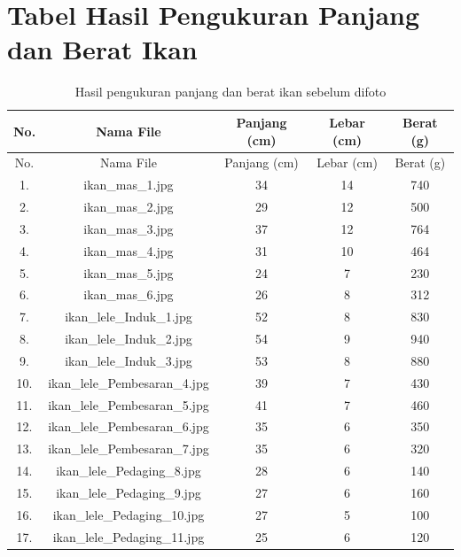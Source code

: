 \chapter{Tabel Hasil Pengukuran Panjang dan Berat Ikan}

\begin{longtable}{|c|c|c|c|c|}
        \caption{Hasil pengukuran panjang dan berat ikan sebelum difoto}\label{tab:Asli} \\
        \hline
        No. & Nama File & Panjang (cm) & Lebar (cm) & Berat (g) \\
        \hline
        \endfirsthead
        \hline
        No. & Nama File & Panjang (cm) & Lebar (cm) & Berat (g) \\
        \hline
        \endhead


        1. & ikan\_mas\_1.jpg & 34 & 14 & 740 \\
        \hline
        2. & ikan\_mas\_2.jpg & 29 & 12 & 500 \\
        \hline
        3. & ikan\_mas\_3.jpg & 37 & 12 & 764 \\
        \hline
        4. & ikan\_mas\_4.jpg & 31 &  10 & 464 \\
        \hline
        5. & ikan\_mas\_5.jpg & 24 & 7 & 230 \\
        \hline
        6. & ikan\_mas\_6.jpg & 26 & 8 & 312 \\
        \hline
        7. & ikan\_lele\_Induk\_1.jpg & 52 & 8 & 830 \\
        \hline
        8. & ikan\_lele\_Induk\_2.jpg & 54 & 9 & 940 \\
        \hline
        9. & ikan\_lele\_Induk\_3.jpg & 53 & 8 & 880 \\
        \hline
        10. & ikan\_lele\_Pembesaran\_4.jpg & 39 & 7 & 430 \\
        \hline
        11. & ikan\_lele\_Pembesaran\_5.jpg & 41 & 7 & 460 \\
        \hline
        12. & ikan\_lele\_Pembesaran\_6.jpg & 35 & 6 & 350 \\
        \hline
        13. & ikan\_lele\_Pembesaran\_7.jpg & 35 & 6 & 320 \\
        \hline
        14. & ikan\_lele\_Pedaging\_8.jpg & 28 & 6 & 140 \\
        \hline
        15. & ikan\_lele\_Pedaging\_9.jpg & 27 & 6 & 160 \\
        \hline
        16. & ikan\_lele\_Pedaging\_10.jpg & 27 & 5 & 100 \\
        \hline
        17. & ikan\_lele\_Pedaging\_11.jpg & 25 & 6 & 120 \\

\end{longtable}
